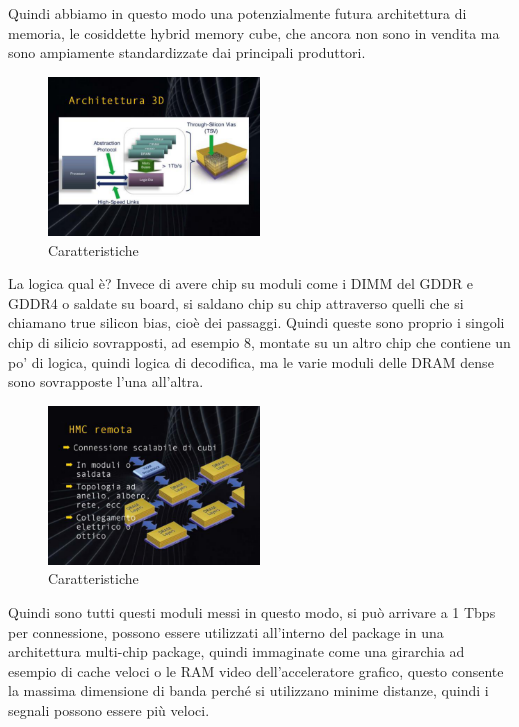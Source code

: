 Quindi abbiamo in questo modo una potenzialmente futura architettura di memoria, le cosiddette hybrid memory cube, che ancora non sono in vendita ma sono ampiamente standardizzate dai principali produttori.

\FloatBarrier
\begin{figure}[H]
  \centering
  \includegraphics[width=0.50\textwidth,
                    trim=20 80 20 20, %
                    clip]
                    {images/Lez05_p04_fig_04.png}
  \caption{Caratteristiche}
  \label{fig:Lez05_p04_fig_04}
\end{figure}
\FloatBarrier
\noindent

La logica qual è? Invece di avere chip su moduli come i DIMM del GDDR e GDDR4 o saldate su board, si saldano chip su chip attraverso quelli che si chiamano true silicon bias, cioè dei passaggi.
Quindi queste sono proprio i singoli chip di silicio sovrapposti, ad esempio 8, montate su un altro chip che contiene un po' di logica, quindi logica di decodifica, ma le varie moduli delle DRAM dense sono sovrapposte l'una all'altra.

\FloatBarrier
\begin{figure}[H]
  \centering
  \includegraphics[width=0.50\textwidth,
                    trim=20 20 20 20, %
                    clip]
                    {images/Lez05_p04_fig_05.png}
  \caption{Caratteristiche}
  \label{fig:Lez05_p04_fig_05}
\end{figure}
\FloatBarrier
\noindent

Quindi sono tutti questi moduli messi in questo modo, si può arrivare a 1 Tbps per connessione, possono essere utilizzati all'interno del package in una architettura multi-chip package, quindi immaginate come una girarchia ad esempio di cache veloci o le RAM video dell'acceleratore grafico, questo consente la massima dimensione di banda perché si utilizzano minime distanze, quindi i segnali possono essere più veloci.

